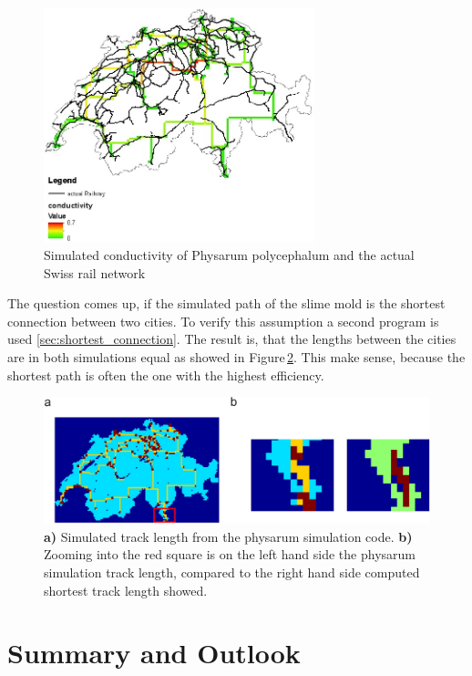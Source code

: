 \documentclass[11pt]{scrartcl}
\begin{document}
\begin{figure}[H]
	\centering
	\includegraphics[width=0.7\textwidth]{figures/conductivity_railway}
	\caption{Simulated conductivity of Physarum polycephalum and the actual Swiss rail network}
	\label{fig:conductivity}
\end{figure}

The question comes up, if the simulated path of the slime mold is the shortest connection between two cities. To verify this assumption a second program is used \ref{sec:shortest_connection}. The result is, that the lengths between the cities are in both simulations equal as showed in Figure\,\ref{fig:short}. This make sense, because the shortest path is often the one with the highest efficiency.

\begin{figure}[H]
	\centering
	\includegraphics[width=12cm]{figures/figure3}
	\caption{\textbf{a)} Simulated track length from the physarum simulation code. \textbf{b)} Zooming into the red square is on the left hand side the physarum simulation track length, compared to the right hand side computed shortest track length showed.}
	\label{fig:short}
\end{figure}
\label{sec:matlab}


\section{Summary and Outlook}
\label{sec:summary}
\end{document}
